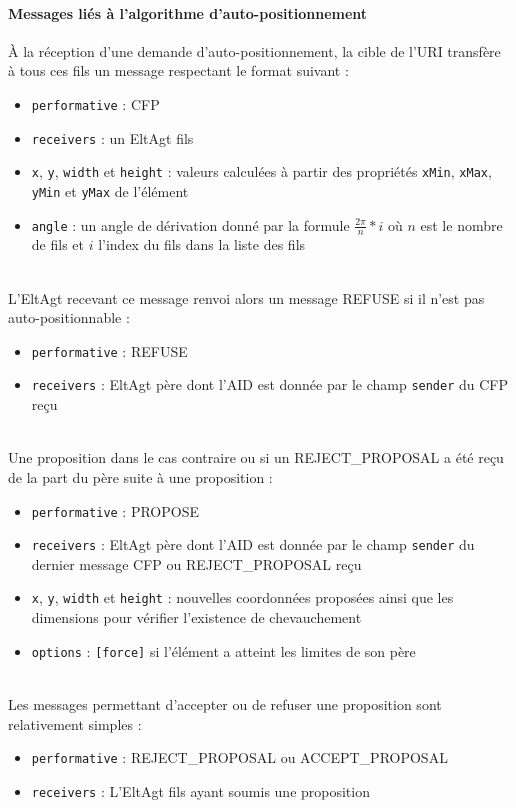 \paragraph{Messages liés à l'algorithme d'auto-positionnement}
À la réception d'une demande d'auto-positionnement, la cible de l'URI transfère à tous ces fils un message respectant le format suivant :
\begin{itemize}
	\item \lstinline$performative$ : CFP
	\item \lstinline$receivers$ : un EltAgt fils
	\item \lstinline$x$, \lstinline$y$, \lstinline$width$ et \lstinline$height$ : valeurs calculées à partir des propriétés \lstinline$xMin$, \lstinline$xMax$, \lstinline$yMin$ et \lstinline$yMax$ de l'élément
	\item \lstinline$angle$ : un angle de dérivation donné par la formule $\frac{2 \pi}{n} * i$ où $n$ est le nombre de fils et $i$ l'index du fils dans la liste des fils
\end{itemize}
~\\
L'EltAgt recevant ce message renvoi alors un message REFUSE si il n'est pas auto-positionnable :
\begin{itemize}
	\item \lstinline$performative$ : REFUSE
	\item \lstinline$receivers$ : EltAgt père dont l'AID est donnée par le champ \lstinline$sender$ du CFP reçu
\end{itemize}
~\\
Une proposition dans le cas contraire ou si un REJECT\_PROPOSAL a été reçu de la part du père suite à une proposition :
\begin{itemize}
	\item \lstinline$performative$ : PROPOSE
	\item \lstinline$receivers$ : EltAgt père dont l'AID est donnée par le champ \lstinline$sender$ du dernier message CFP ou REJECT\_PROPOSAL reçu
	\item \lstinline$x$, \lstinline$y$, \lstinline$width$ et \lstinline$height$ : nouvelles coordonnées proposées ainsi que les dimensions pour vérifier l'existence de chevauchement
	\item \lstinline$options$ : \lstinline$[force]$ si l'élément a atteint les limites de son père
\end{itemize}
~\\
Les messages permettant d'accepter ou de refuser une proposition sont relativement simples :
\begin{itemize}
	\item \lstinline$performative$ : REJECT\_PROPOSAL ou ACCEPT\_PROPOSAL
	\item \lstinline$receivers$ : L'EltAgt fils ayant soumis une proposition
\end{itemize}

